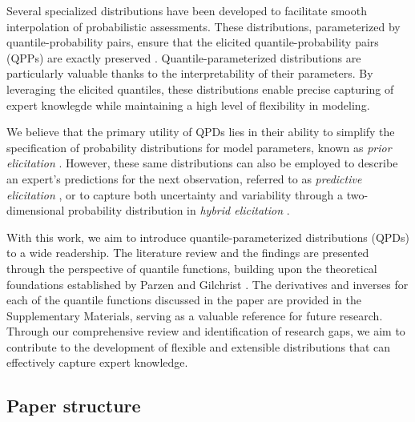 \documentclass[
  fleqn,
  deca,
  blindrev
]{informs4}
\begin{document}
Several specialized distributions have been developed to facilitate
smooth interpolation of probabilistic assessments. These distributions,
parameterized by quantile-probability pairs, ensure that the elicited
quantile-probability pairs (QPPs) are exactly preserved
\citep{keelin2011QuantileParameterizedDistributions, powley2013QuantileFunctionMethods, keelin2016MetalogDistributions, hadlock2017QuantileparameterizedMethodsQuantifying, wilson2023ReconciliationExpertPriors}.
Quantile-parameterized distributions are particularly valuable thanks to
the interpretability of their parameters. By leveraging the elicited
quantiles, these distributions enable precise capturing of expert
knowlegde while maintaining a high level of flexibility in modeling.

We believe that the primary utility of QPDs lies in their ability to
simplify the specification of probability distributions for model
parameters, known as \emph{prior elicitation}
\citep{mikkola2021PriorKnowledgeElicitation}. However, these same
distributions can also be employed to describe an expert's predictions
for the next observation, referred to as \emph{predictive elicitation}
\citep{winkler1980PriorInformationPredictive, kadane1980PredictiveStructuralMethods, akbarov2009ProbabilityElicitationPredictive, hartmann2020FlexiblePriorElicitation},
or to capture both uncertainty and variability through a two-dimensional
probability distribution in \emph{hybrid elicitation}
\citep{perepolkin2024HybridElicitationQuantileparametrized}.

With this work, we aim to introduce quantile-parameterized distributions
(QPDs) to a wide readership. The literature review and the findings are
presented through the perspective of quantile functions, building upon
the theoretical foundations established by Parzen
\citep{parzen1979NonparametricStatisticalData} and Gilchrist
\citep{gilchrist2000StatisticalModellingQuantile}. The derivatives and
inverses for each of the quantile functions discussed in the paper are
provided in the Supplementary Materials, serving as a valuable reference
for future research. Through our comprehensive review and identification
of research gaps, we aim to contribute to the development of flexible
and extensible distributions that can effectively capture expert
knowledge.

\subsection*{Paper structure}\label{paper-structure}
\end{document}
